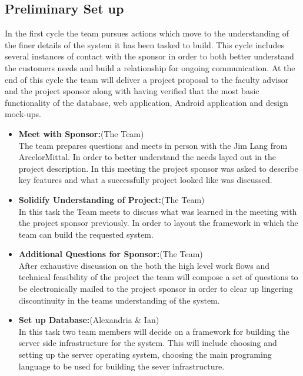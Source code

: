 \documentclass[Letter,11pt]{article}
\begin{document}
	\subsection{Preliminary Set up}\label{cyc1}
		In the first cycle the team pursues actions which move to the understanding of the finer details of the system it has been tasked to build. This cycle includes several instances of contact with the sponsor in order to both better understand the customers needs and build a relationship for ongoing communication. At the end of this cycle the team will deliver a project proposal to the faculty advisor and the project sponsor along with having verified that the most basic functionality of the database, web application, Android application and design mock-ups. 
		
		\begin{itemize}
			\item\textbf{Meet with Sponsor:}(The Team)\\
			The team prepares questions and meets in person with the Jim Lang from ArcelorMittal. In order to better understand the needs layed out in the project description. In this meeting the project sponsor was asked to describe key features and  what a successfully project looked like was discussed.
			
			\item \textbf{Solidify Understanding of Project:}(The Team)\\
			In this task the Team meets to discuss what was learned in the meeting with the project sponsor previously. In order to layout the framework in which the team can build the requested system.
			
			\item\textbf{Additional Questions for Sponsor:}(The Team)\\
			After exhaustive discussion on the both the high level work flows and technical feasibility of the project the team will compose a set of questions to be electronically mailed to the project sponsor in order to clear up lingering discontinuity in the teams understanding of the system.
			
			\item\textbf{Set up Database:}(Alexandria \& Ian)\\
			In this task two team members will decide on a framework for building the server side infrastructure for the system. This will include choosing and setting up the server operating system, choosing the main programing language to be used for building the sever infrastructure.
			

\end{itemize}
\end{document}
